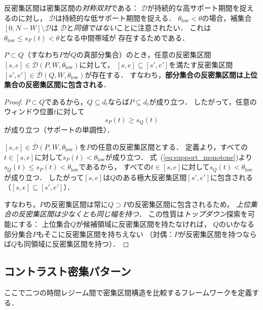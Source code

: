 反密集区間は密集区間の\emph{対称双対}である：
$\mathcal{D}$が持続的な高サポート期間を捉えるのに対し，
$\overline{\mathcal{D}}$は持続的な低サポート期間を捉える．
$\theta_{\text{low}} < \theta$の場合，補集合$[0, N-W] \setminus \mathcal{D}$は
$\overline{\mathcal{D}}$と\emph{同値ではない}ことに注意されたい．
これは$\theta_{\text{low}} \leq s_P(t) < \theta$となる中間帯域が
存在するためである．

\begin{theorem}[反密集区間の単調性]\label{thm:anti_monotone}
$P \subset Q$（すなわち$P$が$Q$の真部分集合）のとき，任意の反密集区間
$[s, e] \in \overline{\mathcal{D}}(P, W, \theta_{\text{low}})$に対して，
$[s, e] \subseteq [s', e']$を満たす反密集区間
$[s', e'] \in \overline{\mathcal{D}}(Q, W, \theta_{\text{low}})$が存在する．
すなわち，\textbf{部分集合の反密集区間は上位集合の反密集区間に包含される}．
\end{theorem}

\begin{proof}
$P \subset Q$であるから，$Q \subseteq d_t$ならば$P \subseteq d_t$が成り立つ．
したがって，任意のウィンドウ位置$t$に対して
\begin{equation}
s_P(t) \geq s_Q(t) \label{eq:support_monotone}
\end{equation}
が成り立つ（サポートの単調性）．

$[s, e] \in \overline{\mathcal{D}}(P, W, \theta_{\text{low}})$を$P$の任意の反密集区間とする．
定義より，すべての$t \in [s, e]$に対して$s_P(t) < \theta_{\text{low}}$が成り立つ．
式~(\ref{eq:support_monotone})より$s_Q(t) \leq s_P(t) < \theta_{\text{low}}$であるから，
すべての$t \in [s, e]$に対して$s_Q(t) < \theta_{\text{low}}$が成り立つ．
したがって$[s, e]$は$Q$のある極大反密集区間$[s', e']$に包含される
（$[s, e] \subseteq [s', e']$）．

すなわち，$P$の反密集区間は常に$Q \supset P$の反密集区間に包含されるため，
\emph{上位集合の反密集区間は少なくとも同じ幅を持つ}．
この性質は\emph{トップダウン}探索を可能にする：
上位集合$Q$が候補領域に反密集区間を持たなければ，
$Q$のいかなる部分集合$P$もそこに反密集区間を持ちえない
（対偶：$P$が反密集区間を持つならば$Q$も同領域に反密集区間を持つ）．
\end{proof}

\subsection{コントラスト密集パターン}

ここで二つの時間レジーム間で密集区間構造を比較するフレームワークを定義する．

